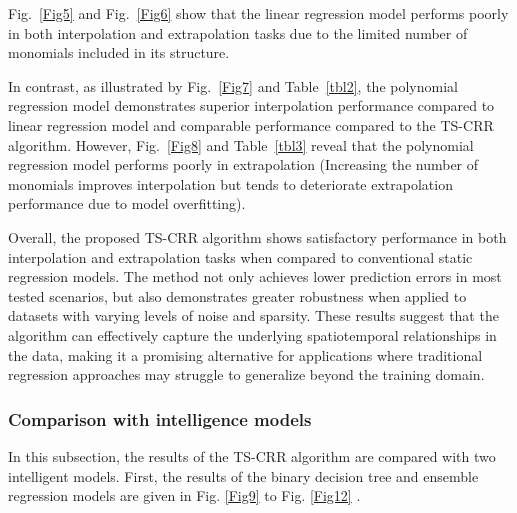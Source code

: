 \documentclass[smallextended,referee,envcountsect,,numbers]{svjour3}
\begin{document}
Fig.~\ref{Fig5} and Fig.~\ref{Fig6} show that the linear regression model performs poorly in both interpolation and extrapolation tasks due to the limited number of monomials included in its structure. 

In contrast, as illustrated by Fig.~\ref{Fig7} and Table~\ref{tbl2}, the polynomial regression model demonstrates superior interpolation performance compared to linear regression model and comparable performance compared to the TS-CRR algorithm. However, Fig.~\ref{Fig8} and Table~\ref{tbl3} reveal that the polynomial regression model performs poorly in extrapolation (Increasing the number of monomials improves interpolation but tends to deteriorate extrapolation performance due to model overfitting).

Overall, the proposed TS-CRR algorithm shows satisfactory performance in both interpolation and extrapolation tasks when compared to conventional static regression models. The method not only achieves lower prediction errors in most tested scenarios, but also demonstrates greater robustness when applied to datasets with varying levels of noise and sparsity. These results suggest that the algorithm can effectively capture the underlying spatiotemporal relationships in the data, making it a promising alternative for applications where traditional regression approaches may struggle to generalize beyond the training domain.
\subsubsection{Comparison with intelligence models}
In this subsection, the results of the TS-CRR algorithm are compared with two intelligent models. First, the results of the binary decision tree and ensemble regression models are given in Fig. \ref{Fig9} to Fig. \ref{Fig12} \cite{myles2004introduction}.  
\end{document}
